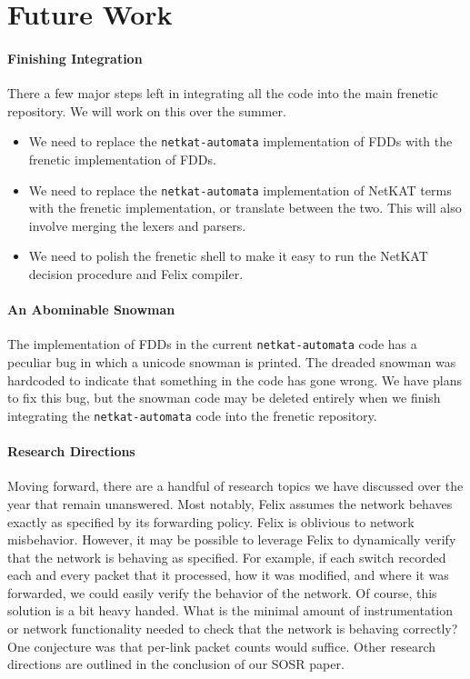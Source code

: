 \documentclass{hw}
\newcommand{\netauto}{\texttt{netkat-automata}}
\begin{document}
\section{Future Work}
\paragraph{Finishing Integration}
There a few major steps left in integrating all the code into the main frenetic
repository. We will work on this over the summer.
\begin{itemize}
  \item
    We need to replace the \netauto{} implementation of FDDs with the frenetic
    implementation of FDDs.
  \item
    We need to replace the \netauto{} implementation of NetKAT terms with the
    frenetic implementation, or translate between the two. This will also
    involve merging the lexers and parsers.
  \item
    We need to polish the frenetic shell to make it easy to run the NetKAT
    decision procedure and Felix compiler.
\end{itemize}

\paragraph{An Abominable Snowman}
The implementation of FDDs in the current \netauto{} code has a peculiar bug in
which a unicode snowman is printed. The dreaded snowman was hardcoded to
indicate that something in the code has gone wrong. We have plans to fix this
bug, but the snowman code may be deleted entirely when we finish integrating
the \netauto{} code into the frenetic repository.

\paragraph{Research Directions}
Moving forward, there are a handful of research topics we have discussed over
the year that remain unanswered. Most notably, Felix assumes the network
behaves exactly as specified by its forwarding policy. Felix is oblivious to
network misbehavior. However, it may be possible to leverage Felix to
dynamically verify that the network is behaving as specified. For example, if
each switch recorded each and every packet that it processed, how it was
modified, and where it was forwarded, we could easily verify the behavior of
the network. Of course, this solution is a bit heavy handed. What is the
minimal amount of instrumentation or network functionality needed to check that
the network is behaving correctly? One conjecture was that per-link packet
counts would suffice. Other research directions are outlined in the conclusion
of our SOSR paper.
\end{document}
